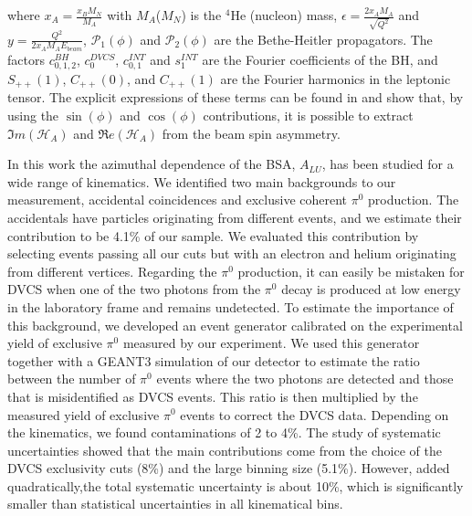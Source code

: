 \documentclass[twocolumn,nofootinbib,showpacs,prl,superscriptaddress,secnumarabic,amssymb,nobibnotes,aps,floatfix]{revtex4}
\begin{document}
where $x_{A} = \frac{x_{B}M_{N}}{M_{A}}$ with $M_{A}$($M_{N}$) is the $^4$He 
(nucleon) mass, $\epsilon = \frac{2x_{A}M_{A}}{\sqrt{Q^{2}}}$ and 
$y=\frac{Q^{2}}{2x_{A}M_{A}E_{beam}}$, $\mathcal{P}_1(\phi)$ and $\mathcal 
{P}_2(\phi)$ are the Bethe-Heitler propagators. The factors $c_{0,1,2}^{BH}$, 
$c_0^{DVCS}$, $c_{0,1}^{INT}$ and $s_1^{INT}$ are the Fourier coefficients of 
the BH, and $S_{++}(1)$, $C_{++}(0)$, and $C_{++}(1)$ are the Fourier harmonics 
in the leptonic tensor.  The explicit expressions of these terms can be found 
in \cite{Belitsky:2008bz} and show that, by using the $\sin(\phi)$ and 
$\cos(\phi)$ contributions, it is possible to extract $\Im m(\mathcal{H}_{A})$ 
and $\Re e(\mathcal{H}_{A})$ from the beam spin
asymmetry. 

In this work the azimuthal dependence of the BSA, $A_{LU}$, has been studied 
for a wide range of kinematics. We identified two main backgrounds to our 
measurement, accidental coincidences and exclusive coherent $\pi^0$ production.  
The accidentals have particles originating from different events, and we 
estimate their  contribution to be 4.1\% of our sample. We evaluated this 
contribution by selecting events passing all our cuts but with an electron and 
helium originating from different vertices. Regarding the $\pi^0$ production, 
it can easily be mistaken for DVCS when one of the two photons from the $\pi^0$ 
decay is produced at low energy in the laboratory frame and remains undetected.  
To estimate the importance of this background, we developed an event generator 
calibrated on the experimental yield of exclusive $\pi^0$ measured by our 
experiment. We used this generator together with a GEANT3 simulation of our 
detector to estimate the ratio between the number of $\pi^0$ events where the 
two photons are detected and those that is misidentified as DVCS events. This 
ratio is then multiplied by the measured yield of exclusive $\pi^0$ events to 
correct the DVCS data.  Depending on the kinematics, we found contaminations of 
2 to 4\%. The study of systematic uncertainties showed that the main 
contributions come from the choice of the DVCS exclusivity cuts (8\%) and the 
large binning size (5.1\%). However, added quadratically,the total systematic 
uncertainty is about 10\%, which is significantly smaller than statistical 
uncertainties in all kinematical bins. 
\end{document}
